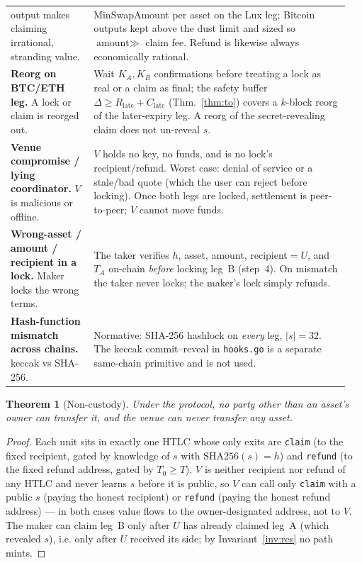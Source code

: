 \documentclass[11pt]{article}
\newtheorem{theorem}{Theorem}
\begin{document}
\begin{center}
\begin{tabular}{@{}p{0.235\linewidth}p{0.715\linewidth}@{}}
output makes claiming irrational, stranding value.
& \textsf{MinSwapAmount} per asset on the Lux leg; Bitcoin outputs kept above
the dust limit and sized so $\text{amount}\gg$ claim fee. Refund is likewise
always economically rational. \\[2pt]
\textbf{Reorg on BTC/ETH leg.} A lock or claim is reorged out.
& Wait $K_A,K_B$ confirmations before treating a lock as real or a claim as
final; the safety buffer $\Delta \ge R_{\text{late}}+C_{\text{late}}$
(Thm.~\ref{thm:to}) covers a $k$-block reorg of the later-expiry leg. A reorg of
the secret-revealing claim does not un-reveal $s$. \\[2pt]
\textbf{Venue compromise / lying coordinator.} $V$ is malicious or offline.
& $V$ holds no key, no funds, and is no lock's recipient/refund. Worst case:
denial of service or a stale/bad quote (which the user can reject before
locking). Once both legs are locked, settlement is peer-to-peer; $V$ cannot move
funds. \\[2pt]
\textbf{Wrong-asset / amount / recipient in a lock.} Maker locks the wrong terms.
& The taker verifies $h$, asset, amount, recipient$=U$, and $T_A$ on-chain
\emph{before} locking leg~B (step~4). On mismatch the taker never locks; the
maker's lock simply refunds. \\[2pt]
\textbf{Hash-function mismatch across chains.} keccak vs SHA-256.
& Normative: SHA-256 hashlock on \emph{every} leg, $|s|=32$. The keccak
commit--reveal in \texttt{hooks.go} is a separate same-chain primitive and is
not used. \\
\bottomrule
\end{tabular}
\end{center}

\begin{theorem}[Non-custody]
Under the protocol, no party other than an asset's owner can transfer it, and
the venue can never transfer any asset.
\end{theorem}
\begin{proof}
Each unit sits in exactly one HTLC whose only exits are \texttt{claim} (to the
fixed recipient, gated by knowledge of $s$ with $\mathrm{SHA256}(s)=h$) and
\texttt{refund} (to the fixed refund address, gated by $T_0\ge T$). $V$ is
neither recipient nor refund of any HTLC and never learns $s$ before it is
public, so $V$ can call only \texttt{claim} with a public $s$ (paying the honest
recipient) or \texttt{refund} (paying the honest refund address) --- in both
cases value flows to the owner-designated address, not to $V$. The maker can
claim leg~B only after $U$ has already claimed leg~A (which revealed $s$),
i.e. only after $U$ received its side; by Invariant~\ref{inv:res} no path mints.
\end{proof}
\end{document}

